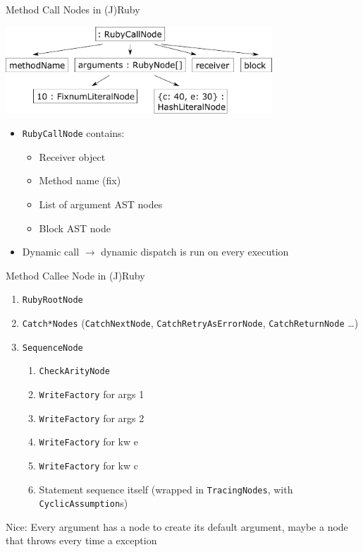 \documentclass[xcolor=dvipsname,handout]{beamer} %
\begin{document}
\begin{frame}{Method Call Nodes in (J)Ruby}
\begin{table}
    \centering
    \includegraphics[width=0.75\textwidth]{kwarg_1.pdf}
\end{table}

\begin{itemize}
    \item \lstinline{RubyCallNode} contains:
      \begin{itemize}
      \item Receiver object
      \item Method name (fix)
      \item List of argument AST nodes
      \item Block AST node
      \end{itemize}
    \item Dynamic call $\rightarrow$ dynamic dispatch is run on every execution
\end{itemize}
\end{frame}

\begin{frame}{Method Callee Node in (J)Ruby}
\begin{enumerate}
 \item \lstinline{RubyRootNode}
 \item \lstinline{Catch*Nodes} (\lstinline{CatchNextNode}, \lstinline{CatchRetryAsErrorNode}, \lstinline{CatchReturnNode} \dots)
 \item \lstinline{SequenceNode} \begin{enumerate}
    \item \lstinline{CheckArityNode}
    \item \lstinline{WriteFactory} for args 1
    \item \lstinline{WriteFactory} for args 2
    \item \lstinline{WriteFactory} for kw e
    \item \lstinline{WriteFactory} for kw c
    \item Statement sequence itself (wrapped in \lstinline{TracingNodes}, with \lstinline{CyclicAssumption}s)
  \end{enumerate}
\end{enumerate}
Nice: Every argument has a node to create its default argument, maybe a node that throws every time a exception
\end{frame}
\end{document}
